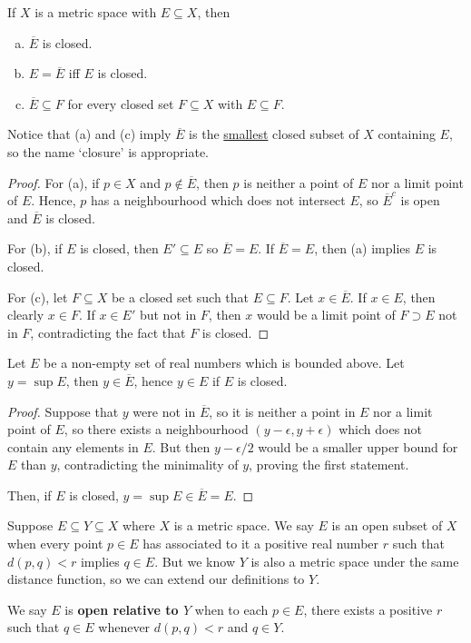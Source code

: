 \begin{theorem}
If $X$ is a metric space with $E \subseteq X$, then
\begin{enumerate}[(a)]
\item $\overline{E}$ is closed.
\item $E = \overline{E}$ iff $E$ is closed.
\item $\overline{E} \subseteq F$ for every closed set $F \subseteq X$ with $E \subseteq F$.
\end{enumerate}
Notice that (a) and (c) imply $\overline{E}$ is the \underline{smallest} closed subset of $X$ containing $E$, so the name `closure' is appropriate.

\begin{proof}
For (a), if $p \in X$ and $p \not\in \overline{E}$, then $p$ is neither a point of $E$ nor a limit point of $E$. Hence, $p$ has a neighbourhood which does not intersect $E$, so $\overline{E}^c$ is open and $\overline{E}$ is closed.

For (b), if $E$ is closed, then $E' \subseteq E$ so $\overline{E} = E$. If $\overline{E} = E$, then (a) implies $E$ is closed.

For (c), let $F \subseteq X$ be a closed set such that $E \subseteq F$. Let $x \in \overline{E}$. If $x \in E$, then clearly $x \in F$. If $x \in E'$ but not in $F$, then $x$ would be a limit point of $F \supset E$ not in $F$, contradicting the fact that $F$ is closed.
\end{proof}
\end{theorem}

\begin{theorem}
Let $E$ be a non-empty set of real numbers which is bounded above. Let $y = \sup E$, then $y \in \overline{E}$, hence $y \in E$ if $E$ is closed.

\begin{proof}
Suppose that $y$ were not in $\overline{E}$, so it is neither a point in $E$ nor a limit point of $E$, so there exists a neighbourhood $(y - \epsilon, y + \epsilon)$ which does not contain any elements in $E$. But then $y - \epsilon/2$ would be a smaller upper bound for $E$ than $y$, contradicting the minimality of $y$, proving the first statement.

Then, if $E$ is closed, $y = \sup E \in \overline{E} = E$.
\end{proof}
\end{theorem}

\begin{remark}
Suppose $E \subseteq Y \subseteq X$ where $X$ is a metric space. We say $E$ is an open subset of $X$ when every point $p \in E$ has associated to it a positive real number $r$ such that $d(p, q) < r$ implies $q \in E$. But we know $Y$ is also a metric space under the same distance function, so we can extend our definitions to $Y$.

We say $E$ is \textbf{open relative to $Y$} when to each $p \in E$, there exists a positive $r$ such that $q \in E$ whenever $d(p, q) < r$ and $q \in Y$. 
\end{remark}

